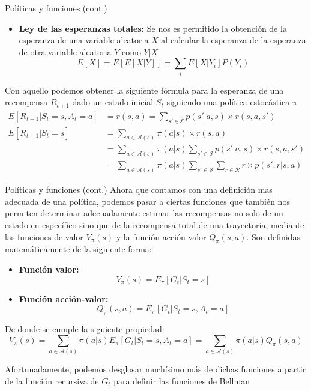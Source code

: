 \documentclass[10pt]{beamer}
\begin{document}
		\begin{frame}{Políticas y funciones (cont.)}
			\begin{itemize}
				\item \textbf{Ley de las esperanzas totales:} Se nos es permitido la obtención de la esperanza de una variable aleatoria $X$ al calcular la esperanza de la esperanza de otra variable aleatoria $Y$ como $Y|X$
				\[
				E[X] = E[E[X|Y]] = \sum_i E[X | Y_i] P(Y_i)
				\]
			\end{itemize}

			Con aquello podemos obtener la siguiente fórmula para la esperanza de una recompensa $R_{t+1}$ dado un estado inicial $S_t$ siguiendo una política estocástica $\pi$
			\[
			\begin{aligned}
				E[R_{t+1} | S_t = s, A_t = a] &= r(s, a) = \sum_{s' \in \mathcal{S}} p(s' | a, s) \times r(s, a, s')  \\
				E[R_{t+1} | S_t = s] &= \sum_{a \in \mathcal{A}(s)} \pi(a | s) \times r(s, a) \\
				&= \sum_{a \in \mathcal{A}(s)} \pi(a | s) \sum_{s' \in \mathcal{S}} p(s' | a, s) \times r(s, a, s') \\
				&= \sum_{a \in \mathcal{A}(s)} \pi(a | s) \sum_{s' \in \mathcal{S}} \sum_{r \in \mathcal{R}} r \times p(s',r | s,a)
			\end{aligned}
			\]
		\end{frame}

		\begin{frame}{Políticas y funciones (cont.)}
			Ahora que contamos con una definición mas adecuada de una política, podemos pasar a ciertas funciones que también nos permiten determinar adecuadamente estimar las recompensas
			no solo de un estado en específico sino que de la recompensa total de una trayectoria, mediante las funciones de valor $V_{\pi}(s)$ y la función acción-valor $Q_{\pi}(s, a)$.
			Son definidas matemáticamente de la siguiente forma:

			\begin{itemize}
				\item \textbf{Función valor:}
				\[
				V_{\pi}(s) = E_{\pi}\left[G_t | S_t = s\right] 
				\]
				\item \textbf{Función acción-valor:}
				\[
				Q_{\pi}(s, a) = E_{\pi}\left[G_t | S_t = s, A_t = a\right]
				\]
			\end{itemize}

			De donde se cumple la siguiente propiedad:
			\[
			V_{\pi}(s) = \sum_{a \in \mathcal{A}(s)} \pi(a | s) E_{\pi}\left[G_t | S_t = s, A_t = a\right] = \sum_{a \in \mathcal{A}(s)} \pi(a | s) Q_{\pi}(s, a)
			\]

			Afortunadamente, podemos desglosar muchísimo más de dichas funciones a partir de la función recursiva de $G_t$ para definir las funciones de Bellman
		\end{frame}
\end{document}
